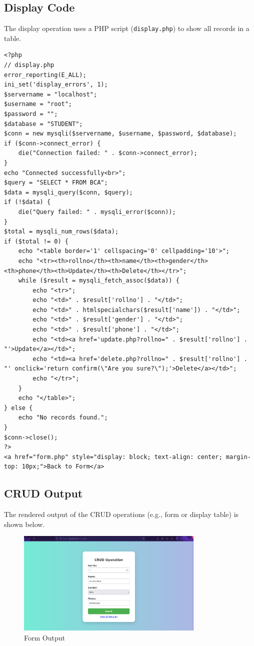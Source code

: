 \documentclass[a4paper,12pt]{article}
\begin{document}
\subsection{Display Code}
The display operation uses a PHP script (\texttt{display.php}) to show all records in a table.

\lstset{language=PHP}
\begin{lstlisting}
<?php
// display.php
error_reporting(E_ALL);
ini_set('display_errors', 1);
$servername = "localhost";
$username = "root";
$password = "";
$database = "STUDENT";
$conn = new mysqli($servername, $username, $password, $database);
if ($conn->connect_error) {
    die("Connection failed: " . $conn->connect_error);
}
echo "Connected successfully<br>";
$query = "SELECT * FROM BCA";
$data = mysqli_query($conn, $query);
if (!$data) {
    die("Query failed: " . mysqli_error($conn));
}
$total = mysqli_num_rows($data);
if ($total != 0) {
    echo "<table border='1' cellspacing='0' cellpadding='10'>";
    echo "<tr><th>rollno</th><th>name</th><th>gender</th><th>phone</th><th>Update</th><th>Delete</th></tr>";
    while ($result = mysqli_fetch_assoc($data)) {
        echo "<tr>";
        echo "<td>" . $result['rollno'] . "</td>";
        echo "<td>" . htmlspecialchars($result['name']) . "</td>";
        echo "<td>" . $result['gender'] . "</td>";
        echo "<td>" . $result['phone'] . "</td>";
        echo "<td><a href='update.php?rollno=" . $result['rollno'] . "'>Update</a></td>";
        echo "<td><a href='delete.php?rollno=" . $result['rollno'] . "' onclick='return confirm(\"Are you sure?\");'>Delete</a></td>";
        echo "</tr>";
    }
    echo "</table>";
} else {
    echo "No records found.";
}
$conn->close();
?>
<a href="form.php" style="display: block; text-align: center; margin-top: 10px;">Back to Form</a>
\end{lstlisting}


\subsection{CRUD Output}
The rendered output of the CRUD operations (e.g., form or display table) is shown below.

\begin{figure}[H]
    \centering
    \includegraphics[width=0.8\textwidth]{5_screenshot.png}
    \caption{Form Output}
\end{figure}
\end{document}
